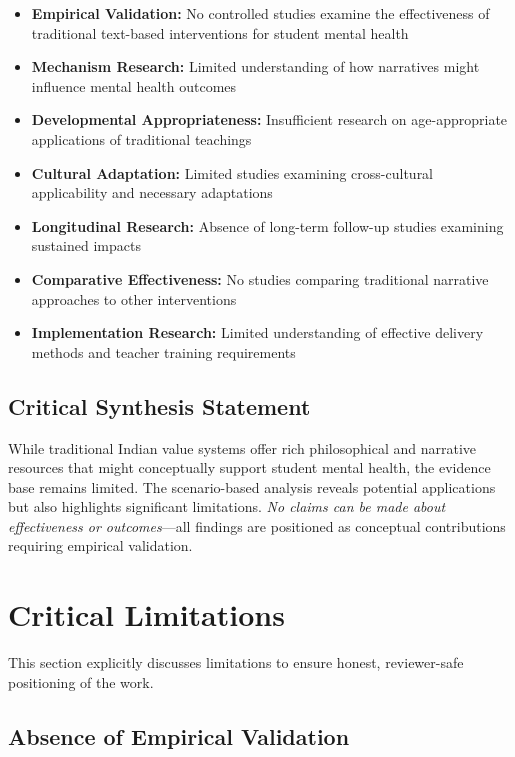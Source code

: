 \documentclass[12pt,a4paper,twocolumn]{article}
\begin{document}
\begin{itemize}
    \item \textbf{Empirical Validation:} No controlled studies examine the effectiveness of traditional text-based interventions for student mental health
    \item \textbf{Mechanism Research:} Limited understanding of how narratives might influence mental health outcomes
    \item \textbf{Developmental Appropriateness:} Insufficient research on age-appropriate applications of traditional teachings
    \item \textbf{Cultural Adaptation:} Limited studies examining cross-cultural applicability and necessary adaptations
    \item \textbf{Longitudinal Research:} Absence of long-term follow-up studies examining sustained impacts
    \item \textbf{Comparative Effectiveness:} No studies comparing traditional narrative approaches to other interventions
    \item \textbf{Implementation Research:} Limited understanding of effective delivery methods and teacher training requirements
\end{itemize}

\subsection{Critical Synthesis Statement}

While traditional Indian value systems offer rich philosophical and narrative resources that might conceptually support student mental health, the evidence base remains limited. The scenario-based analysis reveals potential applications but also highlights significant limitations. \textit{No claims can be made about effectiveness or outcomes}—all findings are positioned as conceptual contributions requiring empirical validation.

\section{Critical Limitations}

This section explicitly discusses limitations to ensure honest, reviewer-safe positioning of the work.

\subsection{Absence of Empirical Validation}
\end{document}

